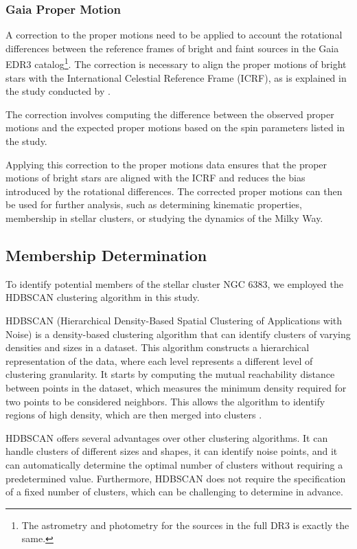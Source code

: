 \documentclass[baaa]{baaa}
\begin{document}
\subsubsection{Gaia Proper Motion}

A correction to the proper motions need to be  applied to account the rotational differences between the reference frames of bright and faint sources in the Gaia EDR3 catalog\footnote{The astrometry and photometry for the sources in the full DR3 is exactly the same.}. The correction is necessary to align the proper motions of bright stars with the International Celestial Reference Frame (ICRF), as is explained in the study conducted by \citet{2021A&A...649A.124C}.

The correction involves computing the difference between the observed proper motions and the expected proper motions based on the spin parameters listed in the study.

Applying this correction to the proper motions data ensures that the proper motions of bright stars are aligned with the ICRF and reduces the bias introduced by the rotational differences. The corrected proper motions can then be used for further analysis, such as determining kinematic properties, membership in stellar clusters, or studying the dynamics of the Milky Way.

\subsection{Membership Determination}\label{Membership Determination}

To identify potential members of the stellar cluster NGC 6383, we employed the HDBSCAN clustering algorithm in this study.

HDBSCAN (Hierarchical Density-Based Spatial Clustering of Applications with Noise) is a density-based clustering algorithm that can identify clusters of varying densities and sizes in a dataset. This algorithm constructs a hierarchical representation of the data, where each level represents a different level of clustering granularity. It starts by computing the mutual reachability distance between points in the dataset, which measures the minimum density required for two points to be considered neighbors. This allows the algorithm to identify regions of high density, which are then merged into clusters \citep{McInnes2017}.

HDBSCAN offers several advantages over other clustering algorithms. It can handle clusters of different sizes and shapes, it can identify noise points, and it can automatically determine the optimal number of clusters without requiring a predetermined value. Furthermore, HDBSCAN does not require the specification of a fixed number of clusters, which can be challenging to determine in advance.
\end{document}
